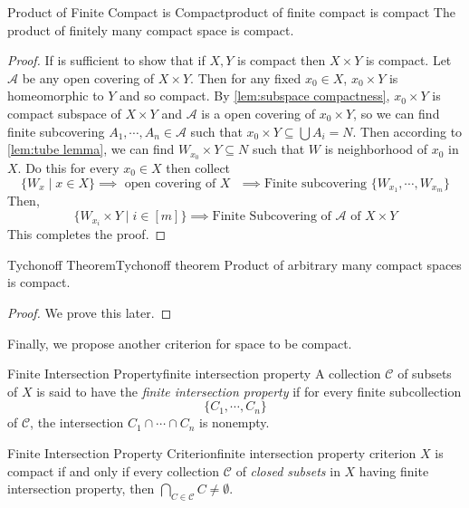 \documentclass[12pt, a4paper, twoside]{article}
\newcommand{\CA}{{\mathcal {A}}} \newcommand{\CB}{{\mathcal {B}}}
\newcommand{\CC}{{\mathcal {C}}} \newcommand{\CD}{{\mathcal {D}}}
\theoremstyle{plain}
\begin{document}
\begin{thm}{Product of Finite Compact is Compact}{product of finite compact is compact}
    The product of finitely many compact space is compact. 
\end{thm}

\begin{proof}
    If is sufficient to show that if $X, Y$ is compact then $X \times Y$ is compact. 
    Let $\CA$ be any open covering of $X \times Y$. 
    Then for any fixed $x_0 \in X$, $x_0 \times Y$ is homeomorphic to $Y$ and so compact. 
    By \ref{lem:subspace compactness}, $x_0 \times Y$ is compact subspace of $X \times Y$ and 
    $\CA$ is a open covering of $x_0 \times Y$, so we can find finite subcovering $A_1, \cdots, A_n \in \CA$ such that 
    $x_0 \times Y \subseteq \bigcup A_i = N$. 
    Then according to \ref{lem:tube lemma}, we can find $W_{x_0} \times Y \subseteq N$ such that $W$ is neighborhood of $x_0$ in $X$. 
    Do this for every $x_0 \in X$ then collect 
    \[\{W_x \mid x \in X\} \implies \text{ open covering of $X$ } \implies \text{Finite subcovering } \{W_{x_1}, \cdots, W_{x_m}\}\]
    Then, 
    \[\{W_{x_i} \times Y \mid i \in [m]\} \implies \text{Finite Subcovering of $\CA$ of $X \times Y$}\] 
    This completes the proof.
\end{proof}

\begin{thm}{Tychonoff Theorem}{Tychonoff theorem}
    Product of arbitrary many compact spaces is compact. 
\end{thm}

\begin{proof}
    We prove this later.
\end{proof}

Finally, we propose another criterion for space to be compact. 

\begin{defn}{Finite Intersection Property}{finite intersection property}
    A collection $\CC$ of subsets of $X$ is said to have the \textit{finite intersection property} if for 
    every finite subcollection 
    \[\{C_1, \cdots, C_n\}\]
    of $\CC$, the intersection $C_1 \cap \cdots \cap C_n$ is nonempty. 
\end{defn}

\begin{thm}{Finite Intersection Property Criterion}{finite intersection property criterion}
    $X$ is compact if and only if every collection $\CC$ of \textit{closed subsets} in $X$ having finite intersection property,
    then $\bigcap_{C \in \CC} C \neq \emptyset$. 
\end{thm}
\end{document}
